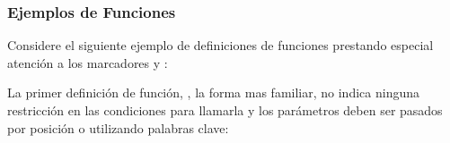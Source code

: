 \documentclass[a5paper,10pt,spanish]{sphinxmanual}
\begin{document}
\subsubsection{Ejemplos de Funciones}
\label{\detokenize{tutorial/controlflow:function-examples}}
\sphinxAtStartPar
Considere el siguiente ejemplo de definiciones de funciones prestando especial atención a los marcadores \sphinxcode{\sphinxupquote{/}} y \sphinxcode{\sphinxupquote{*}}:

\begin{sphinxVerbatim}[commandchars=\\\{\}]
 
    
  
    
  
    
     
      
\end{sphinxVerbatim}

\sphinxAtStartPar
La primer definición de función, , la forma mas familiar, no indica ninguna restricción en las condiciones para llamarla y los parámetros deben ser pasados por posición o utilizando palabras clave:

\begin{sphinxVerbatim}[commandchars=\\\{\}]

\end{sphinxVerbatim}
\end{document}
